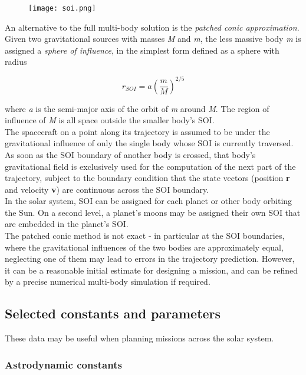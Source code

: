 \documentclass[Orbiter User Manual.tex]{subfiles}
\begin{document}
\begin{figure}[H]
	\centering
	\texttt{[image: soi.png]}
\end{figure}

\noindent
An alternative to the full multi-body solution is the \textit{patched conic approximation}. Given two gravitational sources with masses \textit{M} and \textit{m}, the less massive body \textit{m} is assigned a \textit{sphere of influence}, in the simplest form defined as a sphere with radius

\[ r_{SOI} = a \left( \frac{m}{M} \right)^{2/5} \]

\noindent
where \textit{a} is the semi-major axis of the orbit of \textit{m} around \textit{M}. The region of influence of \textit{M} is all space outside the smaller body’s SOI.\\
The spacecraft on a point along its trajectory is assumed to be under the gravitational influence of only the single body whose SOI is currently traversed. As soon as the SOI boundary of another body is crossed, that body’s gravitational field is exclusively used for the computation of the next part of the trajectory, subject to the boundary condition that the state vectors (position \textbf{r} and velocity \textbf{v}) are continuous across the SOI boundary.\\
In the solar system, SOI can be assigned for each planet or other body orbiting the Sun. On a second level, a planet’s moons may be assigned their own SOI that are embedded in the planet’s SOI.\\
The patched conic method is not exact - in particular at the SOI boundaries, where the gravitational influences of the two bodies are approximately equal, neglecting one of them may lead to errors in the trajectory prediction. However, it can be a reasonable initial estimate for designing a mission, and can be refined by a precise numerical multi-body simulation if required.


\subsection{Selected constants and parameters}
These data may be useful when planning missions across the solar system.

\subsubsection{Astrodynamic constants}
\end{document}
